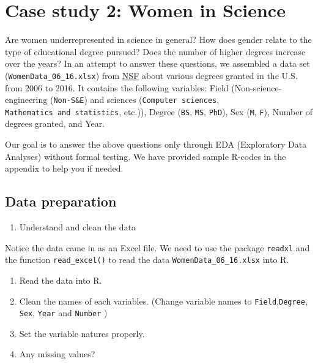 \documentclass[
]{article}
\providecommand{\tightlist}{%
  \setlength{\itemsep}{0pt}\setlength{\parskip}{0pt}}
\begin{document}
\hypertarget{case-study-2-women-in-science}{%
\section{Case study 2: Women in
Science}\label{case-study-2-women-in-science}}

Are women underrepresented in science in general? How does gender relate
to the type of educational degree pursued? Does the number of higher
degrees increase over the years? In an attempt to answer these
questions, we assembled a data set (\texttt{WomenData\_06\_16.xlsx})
from
\href{https://ncses.nsf.gov/pubs/nsf19304/digest/field-of-degree-women}{NSF}
about various degrees granted in the U.S. from 2006 to 2016. It contains
the following variables: Field (Non-science-engineering
(\texttt{Non-S\&E}) and sciences (\texttt{Computer\ sciences},
\texttt{Mathematics\ and\ statistics}, etc.)), Degree (\texttt{BS},
\texttt{MS}, \texttt{PhD}), Sex (\texttt{M}, \texttt{F}), Number of
degrees granted, and Year.

Our goal is to answer the above questions only through EDA (Exploratory
Data Analyses) without formal testing. We have provided sample R-codes
in the appendix to help you if needed.

\hypertarget{data-preparation-1}{%
\subsection{Data preparation}\label{data-preparation-1}}

\begin{enumerate}
\def\labelenumi{\arabic{enumi}.}
\tightlist
\item
  Understand and clean the data
\end{enumerate}

Notice the data came in as an Excel file. We need to use the package
\texttt{readxl} and the function \texttt{read\_excel()} to read the data
\texttt{WomenData\_06\_16.xlsx} into R.

\begin{enumerate}
\def\labelenumi{\roman{enumi}.}
\item
  Read the data into R.
\item
  Clean the names of each variables. (Change variable names to
  \texttt{Field},\texttt{Degree}, \texttt{Sex}, \texttt{Year} and
  \texttt{Number} )
\item
  Set the variable natures properly.
\item
  Any missing values?
\end{enumerate}
\end{document}
